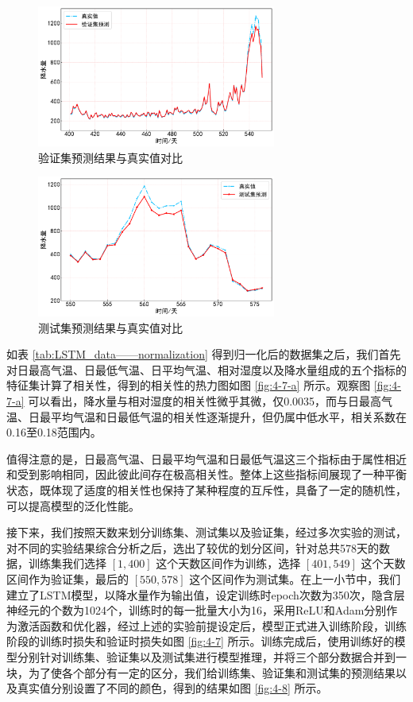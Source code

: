 \begin{figure}[h]
  \centering
  \includegraphics[width=0.7\textwidth]{./Img/LSTM_valid_pre.pdf}
  \caption{验证集预测结果与真实值对比}\label{fig:4-9}
\end{figure}

\begin{figure}[h]
  \centering
  \includegraphics[width=0.7\textwidth]{./Img/LSTM_test_pre.pdf}
  \caption{测试集预测结果与真实值对比}\label{fig:4-10}
\end{figure}


如表 \ref{tab:LSTM_data——normalization} 得到归一化后的数据集之后，我们首先对日最高气温、日最低气温、日平均气温、相对湿度以及降水量组成的五个指标的特征集计算了相关性，得到的相关性的热力图如图 \ref{fig:4-7-a} 所示。观察图 \ref{fig:4-7-a} 可以看出，降水量与相对湿度的相关性微乎其微，仅0.0035，而与日最高气温、日最平均气温和日最低气温的相关性逐渐提升，但仍属中低水平，相关系数在0.16至0.18范围内。

值得注意的是，日最高气温、日最平均气温和日最低气温这三个指标由于属性相近和受到影响相同，因此彼此间存在极高相关性。整体上这些指标间展现了一种平衡状态，既体现了适度的相关性也保持了某种程度的互斥性，具备了一定的随机性，可以提高模型的泛化性能。

接下来，我们按照天数来划分训练集、测试集以及验证集，经过多次实验的测试，对不同的实验结果综合分析之后，选出了较优的划分区间，针对总共578天的数据，训练集我们选择 $[1,400]$ 这个天数区间作为训练，选择 $[401,549]$ 这个天数区间作为验证集，最后的 $[550,578]$ 这个区间作为测试集。在上一小节中，我们建立了LSTM模型，以降水量作为输出值，设定训练时epoch次数为350次，隐含层神经元的个数为1024个，训练时的每一批量大小为16，采用ReLU和Adam分别作为激活函数和优化器，经过上述的实验前提设定后，模型正式进入训练阶段，训练阶段的训练时损失和验证时损失如图 \ref{fig:4-7} 所示。训练完成后，使用训练好的模型分别针对训练集、验证集以及测试集进行模型推理，并将三个部分数据合并到一块，为了使各个部分有一定的区分，我们给训练集、验证集和测试集的预测结果以及真实值分别设置了不同的颜色，得到的结果如图 \ref{fig:4-8} 所示。

